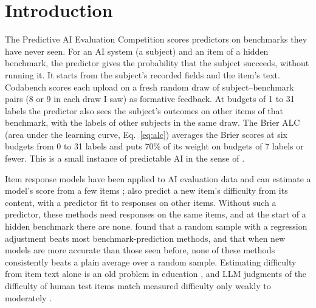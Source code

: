 \section{Introduction}\label{sec:intro}

The Predictive AI Evaluation Competition \citep{truong2026paiec} scores predictors on benchmarks they have never seen. For an AI system (a subject) and an item of a hidden benchmark, the predictor gives the probability that the subject succeeds, without running it. It starts from the subject's recorded fields and the item's text. Codabench scores each upload on a fresh random draw of subject--benchmark pairs (8 or 9 in each draw I saw) as formative feedback. At budgets of 1 to 31 labels the predictor also sees the subject's outcomes on other items of that benchmark, with the labels of other subjects in the same draw. The Brier ALC (area under the learning curve, Eq.~\eqref{eq:alc}) averages the Brier scores at six budgets from 0 to 31 labels and puts 70\% of its weight on budgets of 7 labels or fewer. This is a small instance of predictable AI in the sense of \citet{zhou2026predictable}.

Item response models have been applied to AI evaluation data \citep{lalor2016building,martinezplumed2019irt,rodriguez2021evaluation} and can estimate a model's score from a few items \citep{polo2024tinybenchmarks,truong2025reeval}; \citet{truong2025reeval} also predict a new item's difficulty from its content, with a predictor fit to responses on other items. Without such a predictor, these methods need responses on the same items, and at the start of a hidden benchmark there are none. \citet{zhang2025benchmark} found that a random sample with a regression adjustment beats most benchmark-prediction methods, and that when new models are more accurate than those seen before, none of these methods consistently beats a plain average over a random sample. Estimating difficulty from item text alone is an old problem in education \citep{benedetto2023survey}, and LLM judgments of the difficulty of human test items match measured difficulty only weakly to moderately \citep{chrzan2026consensus,li2026llms}.

